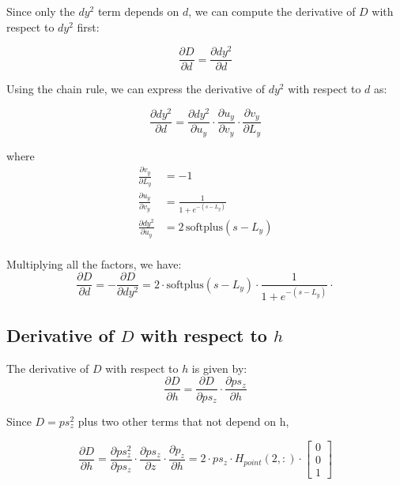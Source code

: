 \documentclass[11pt]{article}
\begin{document}
        Since only the \(dy^2\) term depends on \(d\), we can compute the derivative of \(D\) with respect to \(dy^2\) first:

        \begin{equation}
            \frac{\partial D}{\partial d} = \frac{\partial dy^2}{\partial d}
        \end{equation}

        Using the chain rule, we can express the derivative of \(dy^2\) with respect to \(d\) as:

        \begin{equation}
            \frac{\partial dy^2}{\partial d} = \frac{\partial dy^2}{\partial u_y} \cdot \frac{\partial u_y}{\partial v_y} \cdot \frac{\partial v_y}{\partial L_y}
        \end{equation}

        where
        \begin{align}
            \frac{\partial v_{y}}{\partial L_{y}} &= -1\\
            \frac{\partial u_{y}}{\partial v_{y}} &= \frac{1}{1 + e^{-(s - L_y)}}\\
            \frac{\partial dy^2}{\partial u_y} &= 2\,\text{softplus}(s - L_y)\\
        \end{align}

        Multiplying all the factors, we have:
        \begin{equation}
            \frac{\partial D}{\partial d} = -\frac{\partial D}{\partial dy^2}  = 2 \cdot
                                            \text{softplus}(s - L_y) \cdot
                                            \frac{1}{1 + e^{-(s - L_y)}} \cdot
        \end{equation}

    \subsection*{Derivative of $D$ with respect to $h$}
        The derivative of \(D\) with respect to \(h\) is given by:
        \begin{equation}
            \frac{\partial D}{\partial h} = \frac{\partial D}{\partial ps_{z}} \cdot \frac{\partial ps_{z}}{\partial h}
        \end{equation}

        Since $D = ps^2_z$ plus two other terms that not depend on h,

        \begin{equation}
            \frac{\partial D}{\partial h} = \frac{\partial ps^2_{z}}{\partial ps_z} \cdot  \frac{\partial ps_z}{\partial z} \cdot \frac{\partial p_z}{\partial h} = 2 \cdot ps_z \cdot H_{point}(2,:) \cdot \begin{bmatrix} 0 \\ 0 \\ 1 \end{bmatrix}
        \end{equation}
\end{document}
